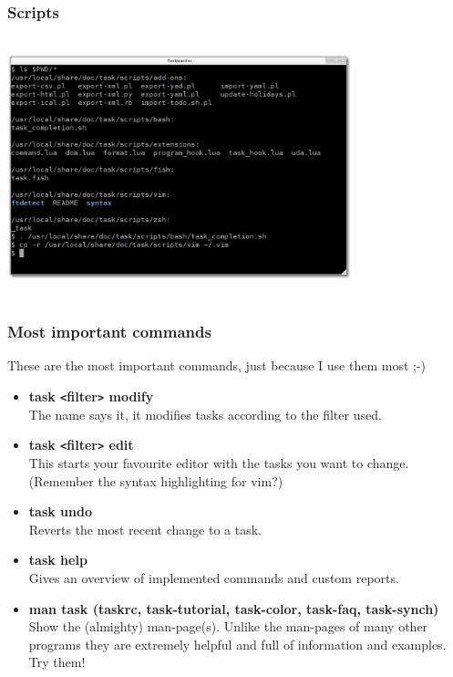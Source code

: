 \documentclass[t,handout]{beamer}
\begin{document}
\begin{frame}
\frametitle{Scripts}
\begin{center}
\includegraphics[width=10cm,height=7.5cm]{scripts.png}
\end{center}
\end{frame}

\begin{frame}
\frametitle{Most important commands}

These are the most important commands, just because I use them most ;-)

\begin{itemize}
\item \textbf{task {\tt<}filter{\tt>} modify} \\
The name says it, it modifies tasks according to the filter used. \pause
\item \textbf{task {\tt<}filter{\tt>} edit} \\
This starts your favourite editor with the tasks you want to change. \\
(Remember the syntax highlighting for vim?) \pause
\item \textbf{task undo} \\
Reverts the most recent change to a task. \pause
\item \textbf{task help} \\
Gives an overview of implemented commands and custom reports. \pause
\item \textbf{man task (taskrc, task-tutorial, task-color, task-faq, task-synch)} \\
Show the (almighty) man-page(s). Unlike the man-pages of many other 
programs they are extremely helpful and full of information and examples. 
Try them!
\end{itemize}
\end{frame}
\end{document}

